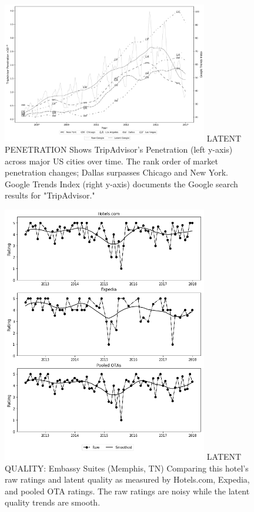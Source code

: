 
\begin{figure}[htp]
\FIGURE
{\includegraphics[width=0.8\textwidth,height=\textheight,keepaspectratio]{./Figures/TA_Penetration.png}}
{LATENT PENETRATION\label{fig:latentpen}}
{Shows TripAdvisor's Penetration (left y-axis) across major US cities over time. The rank order of market penetration changes; Dallas surpasses Chicago and New York. Google Trends Index (right y-axis) documents the Google search results for "TripAdvisor."}
\end{figure}
\clearpage

\begin{figure}[htp]
\FIGURE
{\includegraphics[width=0.8\textwidth,height=\textheight,keepaspectratio]{./Figures/Smoothed_Qual_18987_v2.png}}
{LATENT QUALITY: Embassy Suites (Memphis, TN) \label{fig:latentqual}}
{Comparing this hotel's raw ratings and latent quality as measured by  Hotels.com,  Expedia,  and  pooled  OTA  ratings.  The raw  ratings  are  noisy  while the latent quality trends are smooth.}
\end{figure}
\clearpage

